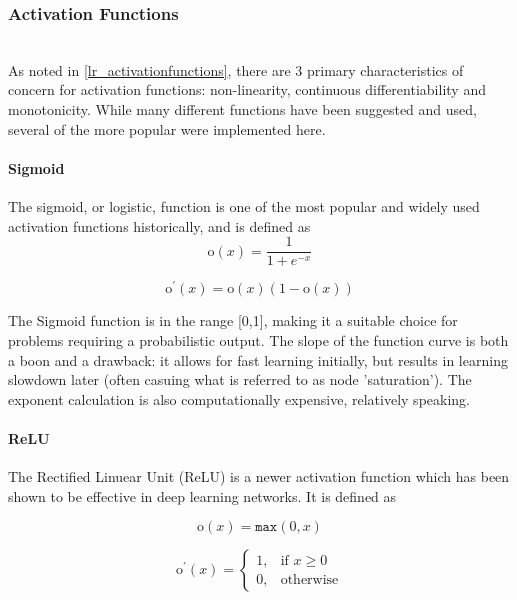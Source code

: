 \documentclass[a4paper,11pt,oneside]{article}
\theoremstyle{plain}
\theoremstyle{definition}
\begin{document}
	\subsubsection{Activation Functions}\label{imp_activation_functions}
	~\\
	As noted in \ref{lr_activationfunctions}, there are 3 primary characteristics of concern for activation functions: non-linearity, continuous differentiability and monotonicity. While many different functions have been suggested and used, several of the more popular were implemented here.
	
	\paragraph{Sigmoid}
	
	The sigmoid, or logistic, function is one of the most popular and widely used activation functions historically, and is defined as 
	\begin{equation}\label{func_sigmoid}
	\mathrm{o}(x) = \frac{1}{1 + e^{-x}}
	\end{equation}
	
	\begin{equation}\label{func_sigmoidprime}
	\mathrm{o}^\prime(x) = \mathrm{o}(x)(1-\mathrm{o}(x))
	\end{equation}
	
	The Sigmoid function is in the range [0,1], making it a suitable choice for problems requiring a probabilistic output. The slope of the function curve is both a boon and a drawback: it allows for fast learning initially, but results in learning slowdown later (often casuing what is referred to as node 'saturation'). The exponent calculation is also computationally expensive, relatively speaking.
	
	\paragraph{ReLU}
	
	The Rectified Linuear Unit (ReLU) is a newer activation function which has been shown to be effective in deep learning networks. It is defined as
	
	\begin{equation}\label{func_relu}
	\mathrm{o}(x) = \texttt{max}(0, x)
	\end{equation}
	
	\begin{equation}\end{equation}\label{func_relu_prime}
	\[
	\mathrm{o}^\prime(x)= 
	\begin{cases}
	1,& \text{if } x\geq 0\\
	0,              & \text{otherwise}
	\end{cases}
	\]
	
\end{document}
